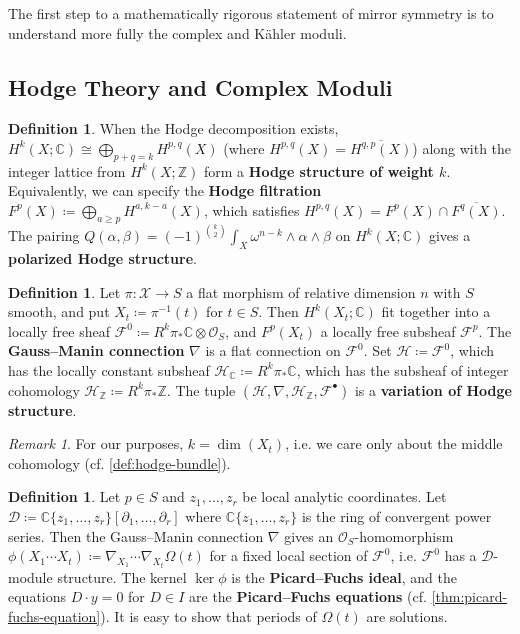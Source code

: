 \documentclass{report}
\theoremstyle{plain}
\theoremstyle{definition}
\newtheorem{definition}[theorem]{Definition}
\theoremstyle{remark}
\newtheorem*{remark}{Remark}
\newcommand{\di}{\partial}
\newcommand{\bC}{\mathbb{C}}
\newcommand{\bZ}{\mathbb{Z}}
\newcommand{\cD}{\mathcal{D}}
\newcommand{\cF}{\mathcal{F}}
\newcommand{\cH}{\mathcal{H}}
\newcommand{\cO}{\mathcal{O}}
\newcommand{\cX}{\mathcal{X}}
\newcommand{\cnj}{\overline}
\begin{document}
The first step to a mathematically rigorous statement of mirror
symmetry is to understand more fully the complex and K\"ahler moduli.

\subsection{Hodge Theory and Complex Moduli}

\begin{definition}
  When the Hodge decomposition exists, $H^k(X; \bC) \cong
  \bigoplus_{p+q=k} H^{p,q}(X)$ (where $H^{p,q}(X) =
  \cnj{H^{q,p}(X)}$) along with the integer lattice from $H^k(X; \bZ)$
  form a {\bf Hodge structure of weight $k$}. Equivalently, we can
  specify the {\bf Hodge filtration} $F^p(X) \coloneqq \bigoplus_{a
    \ge p} H^{a,k-a}(X)$, which satisfies $H^{p,q}(X) = F^p(X) \cap
  \cnj{F^q(X)}$. The pairing $Q(\alpha, \beta) = (-1)^{\binom{k}{2}}
  \int_X \omega^{n-k} \wedge \alpha \wedge \beta$ on $H^k(X; \bC)$
  gives a {\bf polarized Hodge structure}.
\end{definition}

\begin{definition}
  Let $\pi\colon \cX \to S$ a flat morphism of relative dimension $n$
  with $S$ smooth, and put $X_t \coloneqq \pi^{-1}(t)$ for $t \in S$.
  Then $H^k(X_t; \bC)$ fit together into a locally free sheaf $\cF^0
  \coloneqq R^k\pi_*\bC \otimes \cO_S$, and $F^p(X_t)$ a locally free
  subsheaf $\cF^p$. The {\bf Gauss--Manin connection} $\nabla$ is a
  flat connection on $\cF^0$. Set $\cH \coloneqq \cF^0$, which has the
  locally constant subsheaf $\cH_{\bC} \coloneqq R^k\pi_*\bC$, which
  has the subsheaf of integer cohomology $\cH_{\bZ} \coloneqq
  R^k\pi_*\bZ$. The tuple $(\cH, \nabla, \cH_{\bZ}, \cF^\bullet)$ is a
  {\bf variation of Hodge structure}.
\end{definition}

\begin{remark}
  For our purposes, $k = \dim(X_t)$, i.e. we care only about the
  middle cohomology (cf. \ref{def:hodge-bundle}).
\end{remark}

\begin{definition} \label{def:picard-fuchs-equations}
  Let $p \in S$ and $z_1, \ldots, z_r$ be local analytic coordinates.
  Let $\cD \coloneqq \bC\{z_1, \ldots, z_r\}[\di_1, \ldots, \di_r]$
  where $\bC\{z_1, \ldots, z_r\}$ is the ring of convergent power
  series. Then the Gauss--Manin connection $\nabla$ gives an
  $\cO_S$-homomorphism $\phi(X_1\cdots X_t) \coloneqq \nabla_{X_1}
  \cdots \nabla_{X_t} \Omega(t)$ for a fixed local section of $\cF^0$,
  i.e. $\cF^0$ has a $\cD$-module structure. The kernel $\ker \phi$ is
  the {\bf Picard--Fuchs ideal}, and the equations $D \cdot y = 0$ for
  $D \in I$ are the {\bf Picard--Fuchs equations} (cf.
  \ref{thm:picard-fuchs-equation}). It is easy to show that periods of
  $\Omega(t)$ are solutions.
\end{definition}
\end{document}
